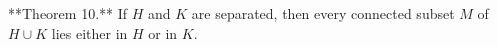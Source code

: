 **Theorem 10.** If $H$ and $K$ are separated, then every connected subset $M$ of $H \cup K$ lies either in $H$ or in $K$.
